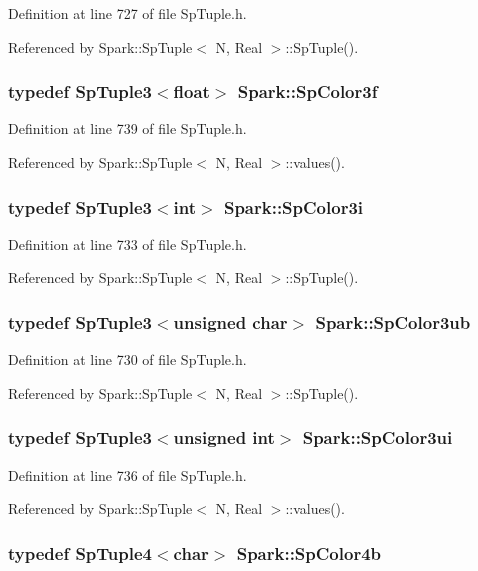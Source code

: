 Definition at line 727 of file Sp\-Tuple.h.

Referenced by Spark::Sp\-Tuple$<$ N, Real $>$::Sp\-Tuple().
\subsubsection{\setlength{\rightskip}{0pt plus 5cm}typedef {\bf Sp\-Tuple3}$<$float$>$ {\bf Spark::Sp\-Color3f}}\label{namespaceSpark_a30}


Definition at line 739 of file Sp\-Tuple.h.

Referenced by Spark::Sp\-Tuple$<$ N, Real $>$::values().
\subsubsection{\setlength{\rightskip}{0pt plus 5cm}typedef {\bf Sp\-Tuple3}$<$int$>$ {\bf Spark::Sp\-Color3i}}\label{namespaceSpark_a26}


Definition at line 733 of file Sp\-Tuple.h.

Referenced by Spark::Sp\-Tuple$<$ N, Real $>$::Sp\-Tuple().
\subsubsection{\setlength{\rightskip}{0pt plus 5cm}typedef {\bf Sp\-Tuple3}$<$unsigned char$>$ {\bf Spark::Sp\-Color3ub}}\label{namespaceSpark_a24}


Definition at line 730 of file Sp\-Tuple.h.

Referenced by Spark::Sp\-Tuple$<$ N, Real $>$::Sp\-Tuple().
\subsubsection{\setlength{\rightskip}{0pt plus 5cm}typedef {\bf Sp\-Tuple3}$<$unsigned int$>$ {\bf Spark::Sp\-Color3ui}}\label{namespaceSpark_a28}


Definition at line 736 of file Sp\-Tuple.h.

Referenced by Spark::Sp\-Tuple$<$ N, Real $>$::values().
\subsubsection{\setlength{\rightskip}{0pt plus 5cm}typedef {\bf Sp\-Tuple4}$<$char$>$ {\bf Spark::Sp\-Color4b}}\label{namespaceSpark_a23}


